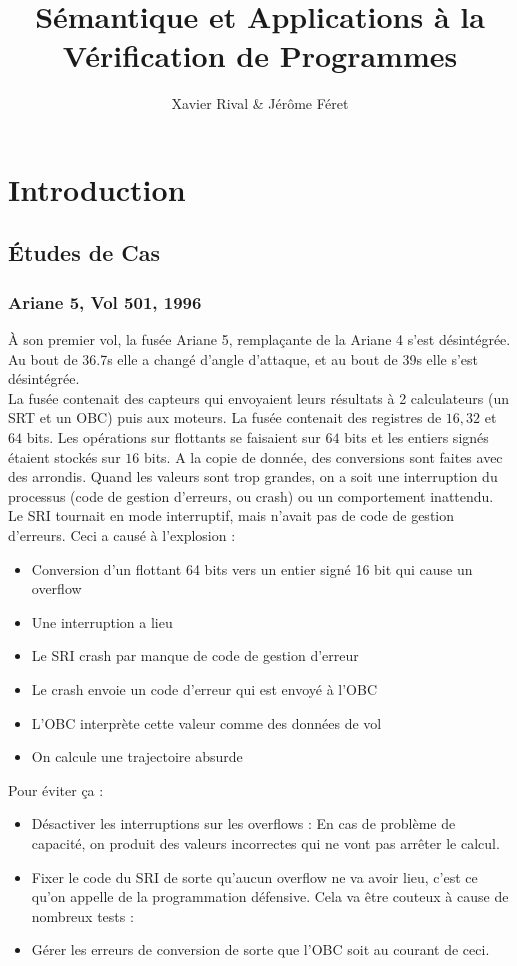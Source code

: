 \documentclass{cours}
\title{Sémantique et Applications à la Vérification de Programmes}
\author{Xavier Rival \& Jérôme Féret}
\begin{document}
\section{Introduction}
\subsection{Études de Cas}
\subsubsection{Ariane 5, Vol 501, 1996}
À son premier vol, la fusée Ariane 5, remplaçante de la Ariane 4 s'est désintégrée. Au bout de 36.7s elle a changé d'angle d'attaque, et au bout de 39s elle s'est désintégrée.\\
La fusée contenait des capteurs qui envoyaient leurs résultats à 2 calculateurs (un SRT et un OBC) puis aux moteurs. La fusée contenait des registres de $16, 32$ et $64$ bits. Les opérations sur flottants se faisaient sur $64$ bits et les entiers signés étaient stockés sur $16$ bits. A la copie de donnée, des conversions sont faites avec des arrondis. Quand les valeurs sont trop grandes, on a soit une interruption du processus (code de gestion d'erreurs, ou crash) ou un comportement inattendu. Le SRI tournait en mode interruptif, mais n'avait pas de code de gestion d'erreurs. Ceci a causé à l'explosion :
\begin{itemize}
	\item Conversion d'un flottant 64 bits vers un entier signé 16 bit qui cause un overflow
	\item Une interruption a lieu
	\item Le SRI crash par manque de code de gestion d'erreur
	\item Le crash envoie un code d'erreur qui est envoyé à l'OBC
	\item L'OBC interprète cette valeur comme des données de vol
	\item On calcule une trajectoire absurde
\end{itemize}

Pour éviter ça :
\begin{itemize}
	\item Désactiver les interruptions sur les overflows : En cas de problème de capacité, on produit des valeurs incorrectes qui ne vont pas arrêter le calcul.
	\item Fixer le code du SRI de sorte qu'aucun overflow ne va avoir lieu, c'est ce qu'on appelle de la programmation défensive. Cela va être couteux à cause de nombreux tests :
	\item Gérer les erreurs de conversion de sorte que l'OBC soit au courant de ceci.
\end{itemize}
\end{document}
